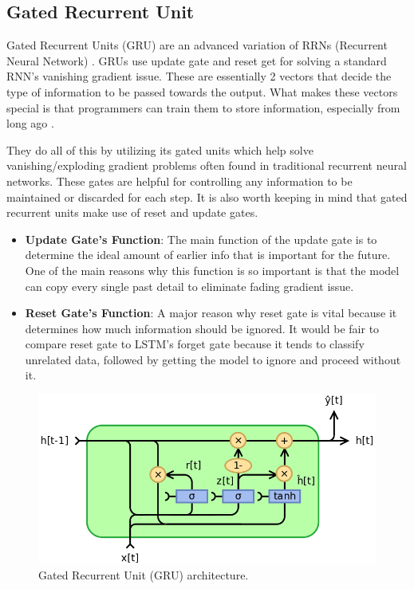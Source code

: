 
\subsection{Gated Recurrent Unit}
Gated Recurrent Units (GRU) are an advanced variation of RRNs (Recurrent Neural Network) \cite{gru2}.
GRUs use update gate and reset get for solving a standard RNN’s vanishing gradient issue. These are essentially 2 vectors that decide the type of information to be passed towards the output. What makes these vectors special is that programmers can train them to store information, especially from long ago \cite{gru1}.

They do all of this by utilizing its gated units which help solve vanishing/exploding gradient problems often found in traditional recurrent neural networks. These gates are helpful for controlling any information to be maintained or discarded for each step. It is also worth keeping in mind that gated recurrent units make use of reset and update gates.

\begin{itemize}
	\item \textbf{Update Gate’s Function}: The main function of the update gate is to determine the ideal amount of earlier info that is important for the future. One of the main reasons why this function is so important is that the model can copy every single past detail to eliminate fading gradient issue.
	\item \textbf{Reset Gate's Function}: A major reason why reset gate is vital because it determines how much information should be ignored. It would be fair to compare reset gate to LSTM’s forget gate because it tends to classify unrelated data, followed by getting the model to ignore and proceed without it.
\end{itemize}

\begin{figure}[H]
	\centering
	\includegraphics[width=.7\linewidth]{chapters/1_introduction/imgs/gru.png}
	\caption{Gated Recurrent Unit (GRU) architecture.}
	\label{fig:gruarch}
\end{figure}

